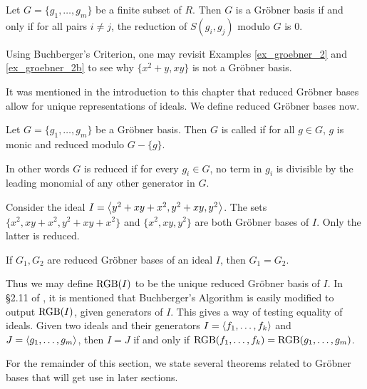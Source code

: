 \begin{theorem}
  Let $G = \{g_1, \ldots, g_m\}$ be a finite subset of $R$.
  Then $G$ is a Gr\"obner basis if and only if for all pairs $i \neq j$,
  the reduction of $S(g_i, g_j)$ modulo $G$ is $0$.
\end{theorem}

Using Buchberger's Criterion, one may revisit Examples \ref{ex_groebner_2} and \ref{ex_groebner_2b}
to see why $\{x^2 + y, xy\}$ is not a Gr\"obner basis.

It was mentioned in the introduction to this chapter
that reduced Gr\"obner bases allow for unique representations of ideals.
We define reduced Gr\"obner bases now.
\begin{definition}
  \label{def_reduced_groebner_basis}
  Let $G = \{g_1, \ldots, g_m\}$ be a Gr\"obner basis.
  Then $G$ is called  if for all $g \in G$, $g$ is monic and reduced modulo $G-\{g\}$.
\end{definition}
In other words $G$ is reduced if for every $g_i \in G$,
no term in $g_i$ is divisible by the leading monomial of any other generator in $G$.

\begin{example}
  \label{ex_groebner_4}
  Consider the ideal $I = \left\langle y^2 + xy + x^2, y^2 + xy, y^2 \right\rangle$.
  The sets $\{x^2, xy + x^2, y^2 + xy + x^2\}$ and $\{x^2, xy, y^2\}$ are both Gr\"obner bases of $I$.
  Only the latter is reduced.
\end{example}

\begin{theorem}
  If $G_1, G_2$ are reduced Gr\"obner bases of an ideal $I$, then $G_1 = G_2$.
\end{theorem}

Thus we may define $\operatorname{RGB}(I)$ to be the unique reduced Gr\"obner basis of $I$.
In \S 2.11 of \cite{buchberger98}, it is mentioned that Buchberger's Algorithm is easily modified
to output $\operatorname{RGB}(I)$, given generators of $I$.
This gives a way of testing equality of ideals.
Given two ideals and their generators $I = \left\langle f_1, \ldots, f_k \right\rangle$ and $J = \left\langle g_1, \ldots, g_m \right\rangle$,
then $I = J$ if and only if $\operatorname{RGB}(f_1, \ldots, f_k) = \operatorname{RGB}(g_1, \ldots, g_m)$.

For the remainder of this section, we state several theorems related to Gr\"obner bases
that will get use in later sections.

